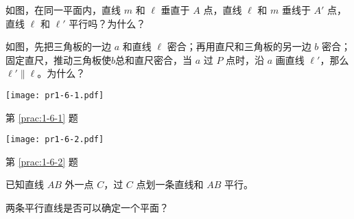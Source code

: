 \begin{Practice}
\begin{question}
	\item\label{prac:1-6-1} 如图，在同一平面内，直线 $m$ 和 $\ell$ 垂直于 $A$ 点，直线 $\ell$ 和 $m$ 垂线于 $A'$ 点，直线 $\ell$ 和 $\ell'$ 平行吗？为什么？
	\item\label{prac:1-6-2} 如图，先把三角板的一边 $a$ 和直线 $\ell$ 密合；再用直尺和三角板的另一边 $b$ 密合；固定直尺，推动三角板使$b$总和直尺密合，当 $a$ 过 $P$ 点时，沿 $a$ 画直线 $\ell'$，那么 $\ell'\parallel \ell$。为什么？
	\begin{figurehere}
		\begin{minipage}[b]{0.48\linewidth}
			\centering
			\texttt{[image: pr1-6-1.pdf]}
			\caption*{第 \ref{prac:1-6-1} 题}
		\end{minipage}
		\begin{minipage}[b]{0.48\linewidth}
			\centering
			\texttt{[image: pr1-6-2.pdf]}
			\caption*{第 \ref{prac:1-6-2} 题}
		\end{minipage}
	\end{figurehere}
\item 已知直线 $AB$ 外一点 $C$，过 $C$ 点划一条直线和 $AB$ 平行。
\item 两条平行直线是否可以确定一个平面？
\end{question}
\end{Practice}

